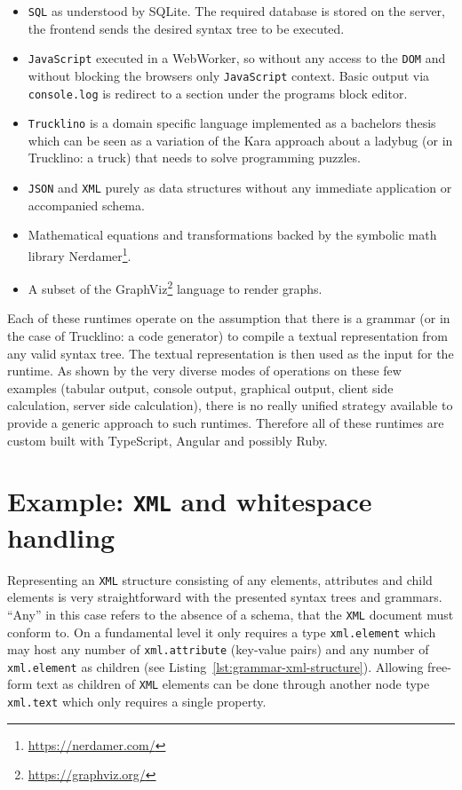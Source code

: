 \documentclass[sigconf,natbib=false,review=true,anonymous]{acmart}
\begin{document}
\begin{itemize}
\item \texttt{SQL} as understood by SQLite. The required database is stored on the server, the frontend sends the desired syntax tree to be executed.

\item \texttt{JavaScript} executed in a WebWorker, so without any access to the \texttt{DOM} and without blocking the browsers only \texttt{JavaScript} context. Basic output via \texttt{console.log} is redirect to a section under the programs block editor.

\item \texttt{Trucklino} is a domain specific language implemented as a bachelors thesis \cite{popp_konzeption_2019} which can be seen as a variation of the Kara approach\cite{hartmann_kara_2001} about a ladybug (or in Trucklino: a truck) that needs to solve programming puzzles.

\item \texttt{JSON} and \texttt{XML} purely as data structures without any immediate application or accompanied schema.

\item Mathematical equations and transformations backed by the symbolic math library Nerdamer\footnote{\url{https://nerdamer.com/}}.

\item A subset of the GraphViz\footnote{\url{https://graphviz.org/}} language to render graphs.
\end{itemize}

Each of these runtimes operate on the assumption that there is a grammar (or in the case of Trucklino: a code generator) to compile a textual representation from any valid syntax tree. The textual representation is then used as the input for the runtime. As shown by the very diverse modes of operations on these few examples (tabular output, console output, graphical output, client side calculation, server side calculation), there is no really unified strategy available to provide a generic approach to such runtimes. Therefore all of these runtimes are custom built with TypeScript, Angular and possibly Ruby.

\section{Example: \texttt{XML} and whitespace handling}

Representing an \texttt{XML} structure consisting of any elements, attributes and child elements is very straightforward with the presented syntax trees and grammars. \enquote{Any} in this case refers to the absence of a schema, that the \texttt{XML} document must conform to. On a fundamental level it only requires a type \texttt{xml.element} which may host any number of \texttt{xml.attribute} (key-value pairs) and any number of \texttt{xml.element} as children (see Listing~\ref{lst:grammar-xml-structure}). Allowing free-form text as children of \texttt{XML} elements can be done through another node type \texttt{xml.text} which only requires a single property.
\end{document}
